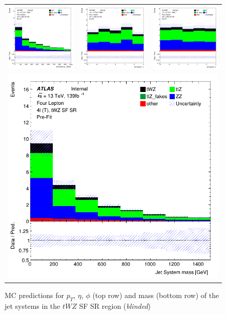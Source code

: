 \begin{figure}[htbp]
\centering
  \begin{tabular}{ccc}

    \includegraphics[width=.2\textwidth]{figures/PreFitPlots/lep4_tWZ_4T_SF_Jet_sys_Pt}&
    \includegraphics[width=.2\textwidth]{figures/PreFitPlots/lep4_tWZ_4T_SF_Jet_sys_Eta} &
    \includegraphics[width=.2\textwidth]{figures/PreFitPlots/lep4_tWZ_4T_SF_Jet_sys_Phi} \\
    \multicolumn{3}{c}{\includegraphics[width=.2\textwidth]{figures/PreFitPlots/lep4_tWZ_4T_SF_Jet_sys_mass}}

  \end{tabular}
  \caption{MC predictions for $p_{T}$, $\eta$, $\phi$ (top row) and mass (bottom row) of the jet systems in the $tWZ$ SF SR region (\textit{blinded})}
  \label{fig:4lep-SF-SR-jet-sys-Plots}
\end{figure}


